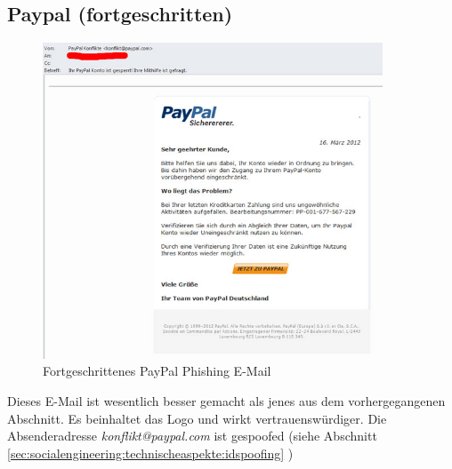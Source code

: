 \subsection{Paypal (fortgeschritten)}
\begin{figure}[H]
  \centering
  \includegraphics[width=0.9\textwidth]{images/phishing-beispiel-paypal3.jpg}
  \caption{Fortgeschrittenes PayPal Phishing E-Mail}
  \label{fig:phishing:beispiele:paypalfortgeschrittenemail}
\end{figure}
Dieses E-Mail ist wesentlich besser gemacht als jenes aus dem vorhergegangenen Abschnitt. Es beinhaltet das Logo und wirkt vertrauenswürdiger. Die Absenderadresse \textit{konflikt@paypal.com} ist gespoofed (siehe Abschnitt \ref{sec:socialengineering:technischeaspekte:idspoofing} )

